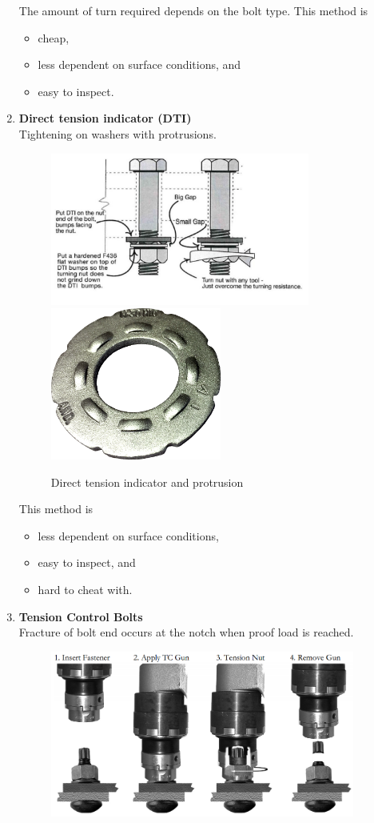 \begin{enumerate}
The amount of turn required depends on the bolt type. This method is
\begin{itemize}
\item cheap,
\item less dependent on surface conditions, and
\item easy to inspect.
\end{itemize}
\item \textbf{Direct tension indicator (DTI)}\\Tightening on washers with protrusions.
\begin{figure}[H]
\centering\includegraphics[height=5cm]{PIC/CH06/DTI}
\includegraphics[height=5cm]{PIC/CH06/PRO}
\caption{Direct tension indicator and protrusion}
\end{figure}
This method is
\begin{itemize}
\item less dependent on surface conditions,
\item easy to inspect, and
\item hard to cheat with.
\end{itemize}
\item \textbf{Tension Control Bolts}\\Fracture of bolt end occurs at the notch when proof load is reached.
\begin{figure}[H]
\centering
\includegraphics[width=10cm]{PIC/CH06/TCB}

\end{figure}
\end{enumerate}
